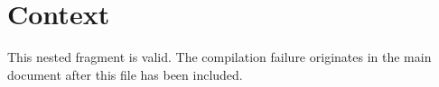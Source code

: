 \section{Context}

This nested fragment is valid. The compilation failure originates in the main
document after this file has been included.
